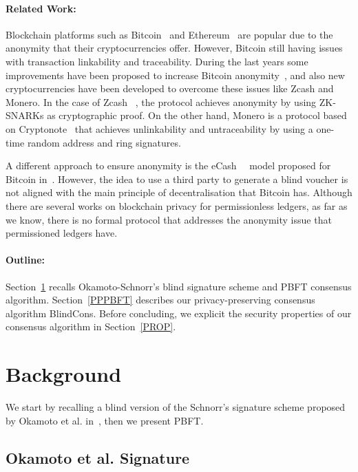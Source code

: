 \documentclass[conference]{IEEEtran}
\newcommand{\name}{BlindCons}
\begin{document}
\paragraph*{Related Work:}
Blockchain platforms such as Bitcoin~\cite{nakamoto2008bitcoin} and Ethereum~\cite{wood2014ethereum} are popular due to the anonymity that their cryptocurrencies offer. However, Bitcoin still having issues with transaction linkability and traceability.  During the last years some improvements have been proposed to increase Bitcoin anonymity~\cite{saxena2014increasing}, and also new cryptocurrencies have been developed to overcome these issues like Zcash and Monero. In the case of Zcash ~\cite{hopwood2016zcash}, the protocol achieves anonymity by using ZK-SNARKs as cryptographic proof. On the other hand, Monero is a protocol based on Cryptonote~\cite{van2013cryptonote} that achieves unlinkability and untraceability by using a one-time random address and ring signatures.

A different approach to ensure anonymity is the eCash~\cite{chaum1983blind}~\cite{chaum1988untraceable} model proposed for Bitcoin in~\cite{heilman2016blindly}. However, the idea to use a third party to generate a blind voucher is not aligned with the main principle of decentralisation that Bitcoin has. Although there are several works on blockchain privacy for permissionless ledgers, as far as we know, there is no formal protocol that addresses the anonymity issue that permissioned ledgers have.

\paragraph*{Outline:}  Section~\ref{back} recalls  Okamoto-Schnorr's blind signature scheme and PBFT consensus algorithm. Section~\ref{PPPBFT} describes our privacy-preserving consensus algorithm \name{}. Before concluding, we explicit the security properties of our consensus algorithm in Section~\ref{PROP}.


\section{Background} \label{back}

We start by recalling a blind version of the Schnorr's signature scheme proposed by Okamoto et al. in~\cite{okamoto1992provably}, then we present PBFT.

\subsection{Okamoto et al. Signature}
\label{Okamoto}
\end{document}
